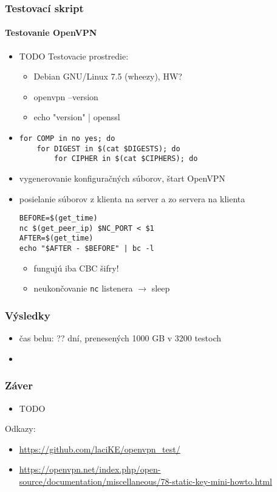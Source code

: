 \documentclass{beamer}
\begin{document}
\begin{frame}[fragile]
	\frametitle{Testovací skript}
	\framesubtitle{Testovanie OpenVPN}
	\begin{itemize}
		\item TODO Testovacie prostredie:
			\begin{itemize}
				\item Debian GNU/Linux 7.5 (wheezy), HW?
				\item openvpn --version
				\item echo "version" | openssl
			\end{itemize}
		\item
{\small
\begin{verbatim}
for COMP in no yes; do
    for DIGEST in $(cat $DIGESTS); do
        for CIPHER in $(cat $CIPHERS); do
\end{verbatim}
}
		\item vygenerovanie konfiguračných súborov, štart OpenVPN
		\item posielanie súborov z klienta na server a zo servera na klienta
{\tiny
\begin{verbatim}
BEFORE=$(get_time)
nc $(get_peer_ip) $NC_PORT < $1
AFTER=$(get_time)
echo "$AFTER - $BEFORE" | bc -l
\end{verbatim}
}
			\begin{itemize} 
				\item fungujú iba CBC šifry!
				\item neukončovanie \texttt{nc} listenera $\rightarrow$ sleep
			\end{itemize}	

	\end{itemize}
\end{frame}

\begin{frame}
	\frametitle{Výsledky}
	\begin{itemize}
		\item čas behu: ?? dní, prenesených 1000 GB v 3200 testoch
		\item 
	\end{itemize}
\end{frame}


\begin{frame}
	\frametitle{Záver}
	\begin{itemize}
		\item TODO
	\end{itemize}

	\bigskip
	Odkazy:
	\small
	\begin{itemize}
		\item \href{https://github.com/laciKE/openvpn\_test/}{https://github.com/laciKE/openvpn\_test/}
		\item \href{https://openvpn.net/index.php/open-source/documentation/miscellaneous/78-static-key-mini-howto.html}{https://openvpn.net/index.php/open-source/documentation/miscellaneous/78-static-key-mini-howto.html}
	\end{itemize}
\end{frame}
\end{document}
